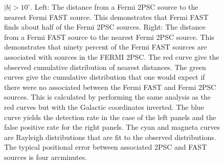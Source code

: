 \documentclass[useAMS,usenatbib]{mn2e}
\begin{document}
\begin{figure}
{  $|b|>10^\circ$.   Left: The distance from a Fermi 2PSC source to the nearest
  Fermi FAST source.  This demonstrates that Fermi FAST finds about
  half of the Fermi 2PSC sources.  Right: The distance from a Fermi
  FAST source to the nearest Fermi 2PSC source.  This demonstrates
  that ninety percent of the Fermi FAST sources are associated with
  sources in the FERMI 2PSC.  The red curve give the observed
  cumulative distribution of nearest distances.  The green curves give
  the cumulative distribution that one would expect if there were no
  associated between the Fermi FAST and Fermi 2PSC sources.  This is
  calculated by performing the same analysis as the red curves but
  with the Galactic coordinates inverted.  The blue curve yields the
  detection rate in the case of the left panels and the false positive
  rate for the right panels. The cyan and magneta curves are Rayleigh
  distributions that are fit to the observed distributions.  The
  typical positional error between associated 2PSC and FAST sources is
  four arcminutes.  }
\label{fig:corresponances}
\end{figure}
\end{document}
